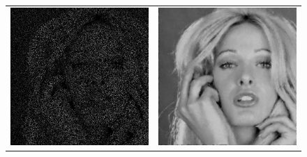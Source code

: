 \begin{figure}[H]
	\centering
	\begin{tabular}{cc}
		\includegraphics[scale=0.2]{Graphics/Examples/woman_blonde_corrupted.tif}&
		\includegraphics[scale=0.2]{Graphics/Examples/woman_blonde_iteration_1.tif}\\

\end{tabular}
\end{figure}
